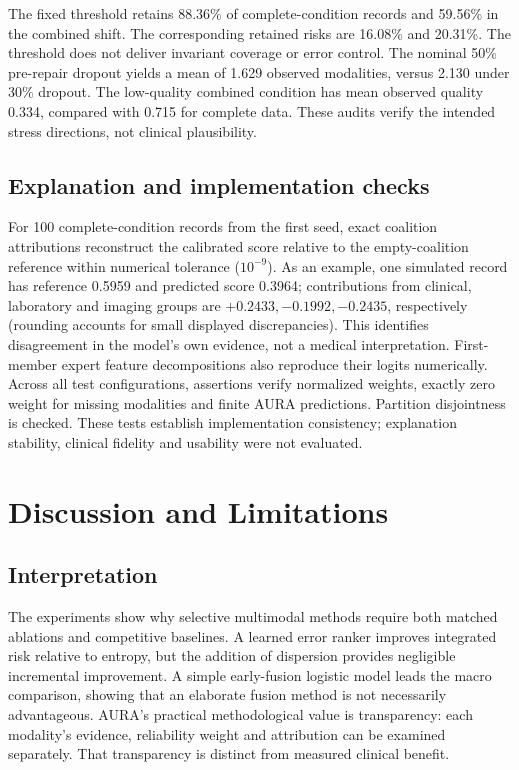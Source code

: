 \documentclass[conference]{IEEEtran}
\begin{document}
The fixed threshold retains 88.36\% of complete-condition records and 59.56\% in the combined shift. The corresponding retained risks are 16.08\% and 20.31\%. The threshold does not deliver invariant coverage or error control. The nominal 50\% pre-repair dropout yields a mean of 1.629 observed modalities, versus 2.130 under 30\% dropout. The low-quality combined condition has mean observed quality 0.334, compared with 0.715 for complete data. These audits verify the intended stress directions, not clinical plausibility.
\subsection{Explanation and implementation checks}
For 100 complete-condition records from the first seed, exact coalition attributions reconstruct the calibrated score relative to the empty-coalition reference within numerical tolerance ($10^{-9}$). As an example, one simulated record has reference 0.5959 and predicted score 0.3964; contributions from clinical, laboratory and imaging groups are $+0.2433,-0.1992,-0.2435$, respectively (rounding accounts for small displayed discrepancies). This identifies disagreement in the model's own evidence, not a medical interpretation. First-member expert feature decompositions also reproduce their logits numerically. Across all test configurations, assertions verify normalized weights, exactly zero weight for missing modalities and finite AURA predictions. Partition disjointness is checked. These tests establish implementation consistency; explanation stability, clinical fidelity and usability were not evaluated.
\section{Discussion and Limitations}
\subsection{Interpretation}
The experiments show why selective multimodal methods require both matched ablations and competitive baselines. A learned error ranker improves integrated risk relative to entropy, but the addition of dispersion provides negligible incremental improvement. A simple early-fusion logistic model leads the macro comparison, showing that an elaborate fusion method is not necessarily advantageous. AURA's practical methodological value is transparency: each modality's evidence, reliability weight and attribution can be examined separately. That transparency is distinct from measured clinical benefit.
\end{document}
